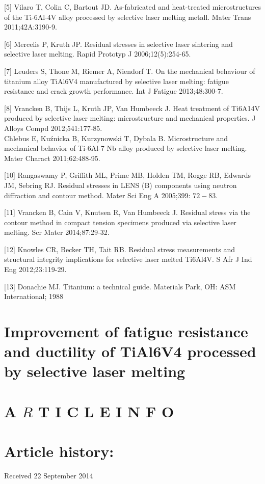 \documentclass[10pt]{article}
\begin{document}
[5] Vilaro T, Colin C, Bartout JD. As-fabricated and heat-treated microstructures of the Ti-6Al-4V alloy processed by selective laser melting metall. Mater Trans 2011;42A:3190-9.

[6] Mercelis P, Kruth JP. Residual stresses in selective laser sintering and selective laser melting. Rapid Prototyp J 2006;12(5):254-65.

[7] Leuders S, Thone M, Riemer A, Niendorf T. On the mechanical behaviour of titanium alloy TiAl6V4 manufactured by selective laser melting: fatigue resistance and crack growth performance. Int J Fatigue 2013;48:300-7.

[8] Vrancken B, Thijs L, Kruth JP, Van Humbeeck J. Heat treatment of Ti6A14V produced by selective laser melting: microstructure and mechanical properties. J Alloys Compd 2012;541:177-85.\\
[9] Chlebus E, Kuźnicka B, Kurzynowski T, Dybala B. Microstructure and mechanical behavior of Ti-6Al-7 $\mathrm{Nb}$ alloy produced by selective laser melting. Mater Charact 2011;62:488-95.

[10] Rangaswamy P, Griffith ML, Prime MB, Holden TM, Rogge RB, Edwards JM, Sebring RJ. Residual stresses in LENS (B) components using neutron diffraction and contour method. Mater Sci Eng A 2005;399: $72-83$.

[11] Vrancken B, Cain V, Knutsen R, Van Humbeeck J. Residual stress via the contour method in compact tension specimens produced via selective laser melting. Scr Mater 2014;87:29-32.

[12] Knowles CR, Becker TH, Tait RB. Residual stress measurements and structural integrity implications for selective laser melted Ti6Al4V. S Afr J Ind Eng 2012;23:119-29.

[13] Donachie MJ. Titanium: a technical guide. Materials Park, OH: ASM International; 1988

\section*{Improvement of fatigue resistance and ductility of TiAl6V4 processed by selective laser melting }


\section*{A $R$ T I C L E I N F O}
\section*{Article history:}
Received 22 September 2014
\end{document}
